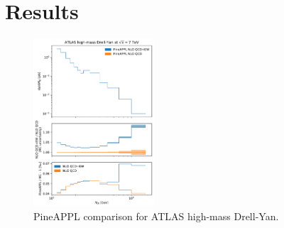 \section{Results}
\label{sec:results}

\begin{figure}
    \centering
    \includegraphics[width=0.4\textwidth]{figures/pineappl_ATLASZHIGHMASS49FB}
    \caption{PineAPPL comparison for ATLAS high-mass Drell-Yan.}
    \label{fig:atlaszhighmass49fb}
\end{figure}

